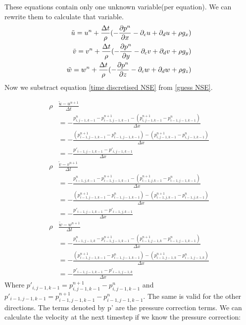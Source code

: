 \documentclass{article}
\begin{document}
These equations contain only one unknown variable(per equation). We can rewrite them to calculate that variable. 
\begin{equation}
  \begin{split}
  \tilde{u}=u^{n}+\frac{\Delta t}{\rho}(-\pdv{p^{n}}{x}-\partial _cu +\partial _du + \rho g_x)\\
  \tilde{v}=v^{n}+\frac{\Delta t}{\rho}(-\pdv{p^{n}}{y}-\partial _cv +\partial _dv + \rho g_y)\\
  \tilde{w}=w^{n}+\frac{\Delta t}{\rho}(-\pdv{p^{n}}{z}-\partial _cw +\partial _dw + \rho g_z)
  \end{split}\label{velocity tilde}
\end{equation} 
Now we substract equation \ref{time discretised NSE} from \ref{guess NSE}.

\begin{equation}
	\begin{split}
			\rho & \frac{\tilde{u} - u^{n+1}}{\Delta t} \\ &= - \frac{p^{n}_{i,j-1,k-1}- p^{n+1}_{i-1,j-1,k-1}-(p^{n+1}_{i,j-1,k-1}- p^{n}_{i-1,j-1,k-1})}{\Delta x}\\
			&=-\frac{(p^{n+1}_{i-1,j-1,k-1}-p^{n}_{i-1,j-1,k-1})- 
			(p^{n+1}_{i,j-1,k-1}-p^{n}_{i,j-1,k-1})
		}{\Delta x}\\
			&=-\frac{p'_{i-1,j-1,k-1}-p'_{i,j-1,k-1}}{\Delta x}\\
\rho & \frac{\tilde{v} - v^{n+1}}{\Delta t} \\ &= - \frac{p^{n}_{i-1,j,k-1}- p^{n+1}_{i-1,j-1,k-1}-(p^{n+1}_{i-1,j,k-1}- p^{n}_{i-1,j-1,k-1})}{\Delta x}\\
			&=-\frac{(p^{n+1}_{i-1,j-1,k-1}-p^{n}_{i-1,j-1,k-1})- 
			(p^{n+1}_{i-1,j,k-1}-p^{n}_{i-1,j,k-1})
		}{\Delta x}\\
			&=-\frac{p'_{i-1,j-1,k-1}-p'_{i-1,j,k-1}}{\Delta x}\\
\rho & \frac{\tilde{w} - w^{n+1}}{\Delta t}  \\ &= - \frac{p^{n}_{i-1,j-1,k}- p^{n+1}_{i-1,j-1,k-1}-(p^{n+1}_{i-1,j-1,k}- p^{n}_{i-1,j-1,k-1})}{\Delta x}\\
			&=-\frac{(p^{n+1}_{i-1,j-1,k-1}-p^{n}_{i-1,j-1,k-1})-(p^{n+1}_{i-1,j-1,k}-p^{n}_{i-1,j-1,k})}{\Delta x}\\
			&=-\frac{p'_{i-1,j-1,k-1}-p'_{i-1,j-1,k}}{\Delta x}
\end{split}
\end{equation}
	Where \(p'_{i,j-1,k-1}=p^{n+1}_{i,j-1,k-1}-p^{n}_{i,j-1,k-1}\) and \(p'_{i-1,j-1,k-1}=p^{n+1}_{i-1,j-1,k-1}-p^{n}_{i-1,j-1,k-1}\).  The same is valid for the other directions. The terms denoted by p' are the pressure correction terms. We can calculate the velocity at the next timestep if we know the pressure correction:
\end{document}
